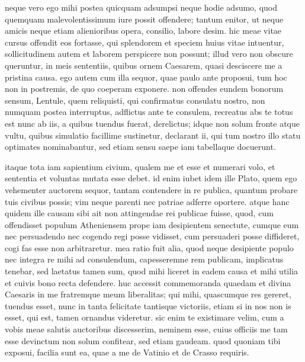  neque vero ego mihi postea quicquam adsumpsi neque hodie adsumo, quod quemquam malevolentissimum iure possit offendere; tantum enitor, ut neque amicis neque etiam alienioribus opera, consilio, labore desim. hic meae vitae cursus offendit eos fortasse, qui splendorem et speciem huius vitae intuentur, sollicitudinem autem et laborem perspicere non possunt; illud vero non obscure queruntur, in meis sententiis, quibus ornem Caesarem, quasi desciscere me a pristina causa. ego autem cum illa sequor, quae paulo ante proposui, tum hoc non in postremis, de quo coeperam exponere. non offendes eundem bonorum sensum, Lentule, quem reliquisti, qui confirmatus consulatu nostro, non numquam postea interruptus, adflictus ante te consulem, recreatus abs te totus est nunc ab iis, a quibus tuendus fuerat, derelictus; idque non solum fronte atque vultu, quibus simulatio facillime sustinetur, declarant ii, qui tum nostro illo statu optimates nominabantur, sed etiam sensu saepe iam tabellaque docuerunt.

 itaque tota iam sapientium civium, qualem me et esse et numerari volo, et sententia et voluntas mutata esse debet. id enim iubet idem ille Plato, quem ego vehementer auctorem sequor, tantam contendere in re publica, quantum probare tuis civibus possis; vim neque parenti nec patriae adferre oportere. atque hanc quidem ille causam sibi ait non attingendae rei publicae fuisse, quod, cum offendisset populum Atheniensem prope iam desipientem senectute, cumque eum nec persuadendo nec cogendo regi posse vidisset, cum persuaderi posse diffideret, cogi fas esse non arbitraretur. mea ratio fuit alia, quod neque desipiente populo nec integra re mihi ad consulendum, capesseremne rem publicam, implicatus tenebar, sed laetatus tamen sum, quod mihi liceret in eadem causa et mihi utilia et cuivis bono recta defendere. huc accessit commemoranda quaedam et divina Caesaris in me fratremque meum liberalitas; qui mihi, quascumque res gereret, tuendus esset, nunc in tanta felicitate tantisque victoriis, etiam si in nos non is esset, qui est, tamen ornandus videretur. sic enim te existimare velim, cum a vobis meae salutis auctoribus discesserim, neminem esse, cuius officiis me tam esse devinctum non solum confitear, sed etiam gaudeam. quod quoniam tibi exposui, facilia sunt ea, quae a me de Vatinio et de Crasso requiris.

